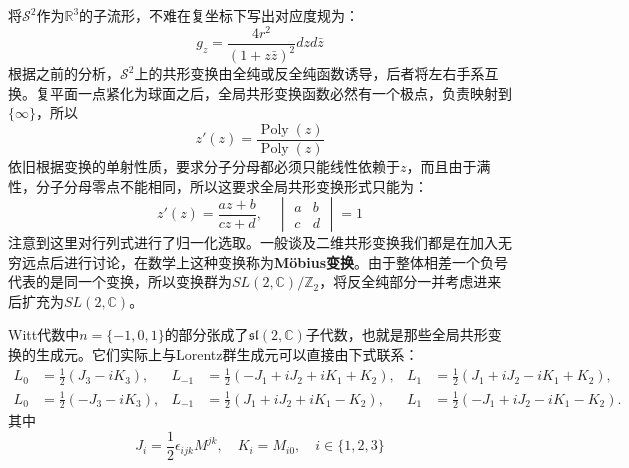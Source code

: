 将$\mathcal{S}^2$作为$\mathbb{R}^3$的子流形，不难在复坐标下写出对应度规为：
\begin{equation}
	g_z=\frac{4r^2}{(1+z\bar z)^2}dzd\bar z
\end{equation}
根据之前的分析，$\mathcal{S}^2$上的共形变换由全纯或反全纯函数诱导，后者将左右手系互换。复平面一点紧化为球面之后，全局共形变换函数必然有一个极点，负责映射到$\{\infty\}$，所以
\[z'(z)=\frac{\operatorname{Poly}(z)}{\operatorname{Poly}(z)}\]
依旧根据变换的单射性质，要求分子分母都必须只能线性依赖于$z$，而且由于满性，分子分母零点不能相同，所以这要求全局共形变换形式只能为：
\begin{equation}
	z'(z)=\frac{a z+b}{c z+d},\quad \begin{vmatrix}
		a&b \\
		c&d
	\end{vmatrix}=1
\end{equation}
注意到这里对行列式进行了归一化选取。一般谈及二维共形变换我们都是在加入无穷远点后进行讨论，在数学上这种变换称为\textbf{M\"obius变换}。由于整体相差一个负号代表的是同一个变换，所以变换群为$SL(2,\mathbb{C})/\mathbb{Z}_2$，将反全纯部分一并考虑进来后扩充为$SL(2,\mathbb{C})$。

Witt代数中$n=\{-1,0,1\}$的部分张成了$\mathfrak{sl}(2,\mathbb{C})$子代数，也就是那些全局共形变换的生成元。它们实际上与Lorentz群生成元可以直接由下式联系：
\begin{equation}
	\begin{aligned}
		L_0&=\frac{1}{2}\left(J_3-iK_3\right),
		&L_{-1}&=\frac{1}{2}\left(-J_1+iJ_2+iK_1+K_2\right),
		&L_{1}&=\frac{1}{2}\left(J_1+iJ_2-iK_1+K_2\right),\\
		L_0&=\frac{1}{2}\left(-J_3-iK_3\right),
		&L_{-1}&=\frac{1}{2}\left(J_1+iJ_2+iK_1-K_2\right),
		&L_{1}&=\frac{1}{2}\left(-J_1+iJ_2-iK_1-K_2\right).
	\end{aligned}
\end{equation}
其中
\[J_i=\frac{1}{2}\epsilon_{ijk}M^{jk},\quad K_i=M_{i0},\quad i\in\{1,2,3\}\]